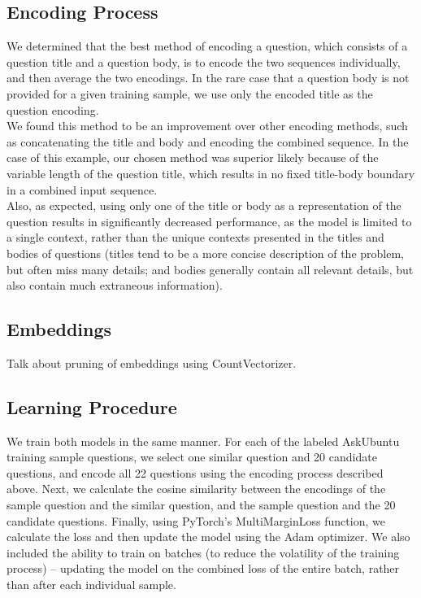 \documentclass[12pt]{article}
\begin{document}
\subsection{Encoding Process}
We determined that the best method of encoding a question, which consists of a question title and a question body, is to encode the two sequences individually, and then average the two encodings. In the rare case that a question body is not provided for a given training sample, we use only the encoded title as the question encoding.\\

We found this method to be an improvement over other encoding methods, such as concatenating the title and body and encoding the combined sequence. In the case of this example, our chosen method was superior likely because of the variable length of the question title, which results in no fixed title-body boundary in a combined input sequence.\\

Also, as expected, using only one of the title or body as a representation of the question results in significantly decreased performance, as the model is limited to a single context, rather than the unique contexts presented in the titles and bodies of questions (titles tend to be a more concise description of the problem, but often miss many details; and bodies generally contain all relevant details, but also contain much extraneous information).

\subsection{Embeddings}
Talk about pruning of embeddings using CountVectorizer.

\subsection{Learning Procedure}
We train both models in the same manner. For each of the labeled AskUbuntu training sample questions, we select one similar question and 20 candidate questions, and encode all 22 questions using the encoding process described above. Next, we calculate the cosine similarity between the encodings of the sample question and the similar question, and the sample question and the 20 candidate questions. Finally, using PyTorch's MultiMarginLoss function, we calculate the loss and then update the model using the Adam optimizer. We also included the ability to train on batches (to reduce the volatility of the training process) -- updating the model on the combined loss of the entire batch, rather than after each individual sample.\\
\end{document}
